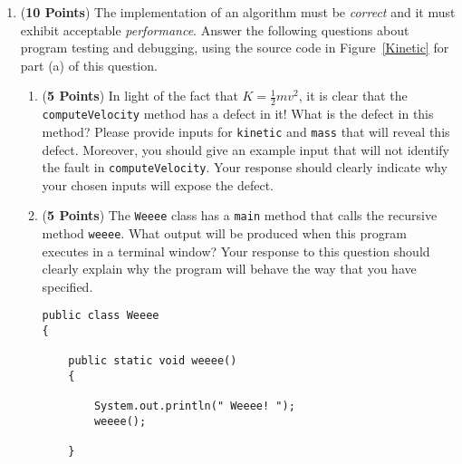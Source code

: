 \documentclass[12pt]{article}
\begin{document}
\begin{enumerate}
\begin{enumerate}

\end{enumerate}

\newpage


\item ({\bf 10 Points}) The implementation of an algorithm must be
  {\em correct} and it must exhibit acceptable {\em performance}.
  Answer the following questions about program testing and debugging,
  using the source code in Figure~\ref{Kinetic} for part (a) of this
  question.

\begin{enumerate}
  
\item ({\bf 5 Points}) In light of the fact that $K =
  \frac{1}{2}mv^2$, it is clear that the {\tt computeVelocity} method
  has a defect in it!  What is the defect in this method?  Please
  provide inputs for {\tt kinetic} and {\tt mass} that will reveal
  this defect.  Moreover, you should give an example input that will
  not identify the fault in {\tt computeVelocity}.  Your response
  should clearly indicate why your chosen inputs will expose the
  defect.

\item ({\bf 5 Points}) The {\tt Weeee} class has a {\tt main} method
  that calls the recursive method {\tt weeee}.  What output will be
  produced when this program executes in a terminal window?  Your
  response to this question should clearly explain why the program
  will behave the way that you have specified.

\begin{verbatim}
public class Weeee
{

    public static void weeee()
    {

        System.out.println(" Weeee! ");
        weeee();

    }


\end{verbatim}
\end{enumerate}
\end{enumerate}
\end{document}
